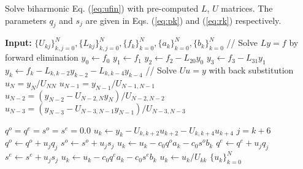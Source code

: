 \documentclass[11pt, oneside]{article}
\begin{document}
\begin{algorithm}
	\caption{Solve biharmonic Eq. (\ref{eq:ufin}) with pre-computed $L$, $U$ 
	matrices. The parameters $q_j$ and $s_j$ are given in Eqs. (\ref{eq:pk}) 
	and 
	(\ref{eq:rk}) respectively. }
	\label{alg:SolveBiharmonic}
	\begin{algorithmic}[1]
		  \State \textbf{Input:} $\{U_{kj}\}_{k,j=0}^{N}, 
		  \{L_{kj}\}_{k,j=0}^{N}, 
		  \{f_k\}_{k=0}^{N}, \{a_k\}_{k=0}^{N}, \{b_k\}_{k=0}^{N}$ 
		  \State // Solve $Ly=f$ by forward elimination 
		  \State $y_0 \gets f_0$
		  \State $y_1 \gets f_1$
		  \State $y_2 \gets f_2 - L_{20}y_{0}$
		  \State $y_3 \gets f_3 - L_{31}y_{1}$
		  \State $y_k \gets f_k - L_{k,k-2}y_{k-2} - L_{k, k-4}y_{k-4}$
		  \EndFor
		  \State // Solve $Uu=y$ with back substitution                    
		  \State $u_N = y_N / U_{NN}$
	      \State $u_{N-1} = y_{N-1} / U_{N-1,N-1}$
	      \State $u_{N-2} = \left(y_{N-2} - U_{N-2, N}y_N\right)/U_{N-2,N-2}$
	      \State $u_{N-3} = \left(y_{N-3} - U_{N-3, 
	      N-1}y_{N-1}\right)/U_{N-3,N-3}$
	      
	      \State $q^o = q^e = s^o = s^e = 0.0$
		  \State $u_k \gets y_k - U_{k, k+2} u_{k+2} - U_{k, k+4} 
		  u_{k+4} $ 
		  \State $j=k+6$
		    \State $q^o \gets q^o + u_{j}q_{j}$
		    \State $s^o \gets s^o + u_{j}s_{j}$
		    \State $u_k \gets u_k - c_0 q^o a_k - c_0 s^o b_k $	    
		  \Else
		    \State $q^e \gets q^e + u_{j}q_{j}$
		    \State $s^e \gets s^e + u_{j}s_{j}$	  
		    \State $u_k \gets u_k - c_0 q^e a_k - c_0 s^e b_k $
		  \EndIf
		  \EndIf
		  \State $u_k \gets  u_k / U_{kk}$
		  \EndFor
		  \State \Return $\{u_k\}_{k=0}^{N}$  
		  
		\EndProcedure
	\end{algorithmic}
\end{algorithm}
\end{document}
